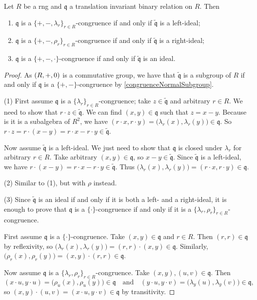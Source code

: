 \begin{proposition} \label{congruenceRingIdeals}
Let $R$ be a rng and $\mathfrak{q}$ a translation invariant binary relation on $R$. Then
\begin{enumerate}
\item $\mathfrak{q}$ is a $\{+,-,\lambda_r\}_{r\in R}$-congruence \textup{if and only if} $\widetilde{\mathfrak{q}}$ is a left-ideal;
\item $\mathfrak{q}$ is a $\{+,-,\rho_r\}_{r\in R}$-congruence \textup{if and only if} $\widetilde{\mathfrak{q}}$ is a right-ideal;
\item $\mathfrak{q}$ is a $\{+,-,\cdot\}$-congruence \textup{if and only if} $\widetilde{\mathfrak{q}}$ is an ideal.
\end{enumerate} 
\end{proposition}
\begin{proof}
As $\sSet{R,+,0}$ is a commutative group, we have that $\widetilde{\mathfrak{q}}$ is a subgroup of $R$ if and only if $\mathfrak{q}$ is a $\{+,-\}$-congruence by \ref{congruenceNormalSubgroup}.

(1) First assume $\mathfrak{q}$ is a $\{\lambda_r\}_{r\in R}$-congruence; take $z\in\widetilde{\mathfrak{q}}$ and arbitrary $r\in R$. We need to show that $r\cdot z \in \widetilde{\mathfrak{q}}$. We can find $(x,y)\in \mathfrak{q}$ such that $z = x-y$. Because is it is a subalgebra of $R^2$, we have $(r\cdot x,r\cdot y) = \big(\lambda_r(x), \lambda_r(y)\big) \in \mathfrak{q}$. So $r\cdot z = r\cdot (x-y) = r\cdot x - r\cdot y \in \widetilde{\mathfrak{q}}$.

Now assume $\widetilde{\mathfrak{q}}$ is a left-ideal.
We just need to show that $\mathfrak{q}$ is closed under $\lambda_r$ for arbitrary $r\in R$. Take arbitrary $(x,y)\in \mathfrak{q}$, so $x-y\in \widetilde{\mathfrak{q}}$. Since $\widetilde{\mathfrak{q}}$ is a left-ideal, we have $r\cdot (x-y) = r\cdot x - r\cdot y \in \widetilde{\mathfrak{q}}$. Thus $\big(\lambda_r(x), \lambda_r(y)\big) = (r\cdot x, r\cdot y) \in \mathfrak{q}$.

(2) Similar to (1), but with $\rho$ instead.

(3) Since $\widetilde{\mathfrak{q}}$ is an ideal if and only if it is both a left- and a right-ideal, it is enough to prove that $\mathfrak{q}$ is a $\{\cdot\}$-congruence if and only if it is a $\{\lambda_r, \rho_r\}_{r\in R}$-congruence.

First assume $\mathfrak{q}$ is a $\{\cdot\}$-congruence. Take $(x,y)\in \mathfrak{q}$ and $r\in R$. Then $(r,r)\in \mathfrak{q}$ by reflexivity, so $\big(\lambda_r(x), \lambda_r(y)\big) = (r,r)\cdot (x,y)\in\mathfrak{q}$. Similarly, $\big(\rho_r(x), \rho_r(y)\big) = (x,y)\cdot (r,r)\in\mathfrak{q}$.

Now assume $\mathfrak{q}$ is a $\{\lambda_r, \rho_r\}_{r\in R}$-congruence. Take $(x,y), (u,v)\in \mathfrak{q}$. Then
\[ (x\cdot u, y\cdot u) = \big(\rho_u(x), \rho_u(y)\big) \in \mathfrak{q} \quad\text{and}\quad (y\cdot u, y\cdot v) = \big(\lambda_y(u), \lambda_y(v)\big) \in \mathfrak{q}, \]
so $(x,y)\cdot (u,v) = (x\cdot u, y\cdot v)\in \mathfrak{q}$ by transitivity.
\end{proof}
